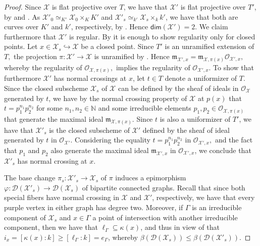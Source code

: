 \documentclass[a4paper,12pt,reqno]{amsart}
\newcommand\mc\mathcal
\theoremstyle{definition}
\numberwithin{equation}{thm}
\renewcommand{\leq}{\leqslant}
\renewcommand{\geq}{\geqslant}
\renewcommand{\dim}{\mathsf{dim}}
\begin{document}
\begin{proof} Since $\mathcal{X}$ is flat projective over $T$, we have that $\mathcal{X}'$ is  flat projective  over $T'$, by \cite[Corollary 3.3.32]{Liu} and \cite[Proposition 4.3.3, (e)]{Liu}. As $\mathcal{X}'_0\simeq_{K'}\mathcal{X}_{0}\times_{K}K'$ and $\mathcal{X}'_s \simeq_{k'} \mathcal{X}_s \times_k k'$, we have that both are curves over $K'$  and $k'$, respectively, by \cite[Proposition 3.2.7]{Liu}. Hence $\dim(\mathcal{X}')=2.$ We claim furthermore that $\mathcal{X}'$ is regular. By \cite[Corollary 4.2.17]{Liu} it is enough to show regularity only for closed points. Let $x\in\mathcal{X}_s \hookrightarrow \mc{X}$ be a closed point. Since $T'$ is an unramified extension of $T,$ the  projection $\pi:\mathcal{X}'\to\mathcal{X}$ is unramified by \cite[Proposition 4.3.22]{Liu}. Hence $\mathfrak{m}_{\mathcal{X}',x}=\mathfrak{m}_{\mathcal{X},\pi(x)}\mathcal{O}_{\mathcal{X}',x},$ whereby the regularity of $\mathcal{O}_{\mathcal{X},\pi(x)},$ implies the regularity of $\mathcal{O}_{\mathcal{X}',x}.$ 
To show that furthermore $\mc{X}'$ has normal crossings at $x$,  let $t\in T$ denote a uniformizer of $T$. Since the closed subscheme $\mathcal{X}_{s}$ of $\mc{X}$ can be defined by the sheaf of ideals in $\mathcal{O}_{\mc{X}}$ generated by $t$, we have by the normal crossing property of $\mc{X}$ at $p(x)$ that $t=p_{1}^{n_{1}}p_{2}^{n_{2}}$ for some $n_{1},n_{2}\in\mathbb{N}$ and some irreducible elements $p_{1},p_{2}\in\mathcal{O}_{\mathcal{X},\pi(x)}$ that generate the maximal ideal $\mathfrak{m}_{\mathcal{X},\pi(x)}.$ Since $t$ is also a uniformizer of $T'$, we have that $\mathcal{X}'_{s}$ is the closed subscheme of $\mathcal{X}'$ defined by the sheaf of ideal generated by $t$ in $\mathcal{O}_{\mathcal{X}'}.$ Considering the equality $t=p_{1}^{n_{1}}p_{2}^{n_{2}}$ in $\mathcal{O}_{\mathcal{X}',x},$ and the fact that $p_{1}$ and $p_{2}$ also generate the maximal ideal $\mathfrak{m}_{\mathcal{X}',x}$ in $\mathcal{O}_{\mathcal{X}',x}$,  we conclude that $\mathcal{X}'_{s}$ has normal crossing at $x.$ 

The base change $\pi_s: \mc{X}'_s \to \mc{X}_s$ of $\pi$ induces a epimorphism  $\varphi: \mc{D}(\mc{X}'_s) \to \mc{D}(\mc{X}_s)$ of bipartite connected graphs. Recall that since both special fibers have normal crossing in  $\mc{X}$ and $\mc{X}'$, respectively, we have that every purple vertex in either graph has degree two.
Moreover, if $\Gamma$ is an irreducible component of $\mc{X}_s$ and $x \in \Gamma$ a point of intersection with another irreducible component, then we have that $\ell_\Gamma \subseteq \kappa(x)$, and thus in view of  that $i_x=[\kappa(x): k] \geq [\ell_\Gamma :k]= e_\Gamma$, whereby  $\beta(\mc{D}(\mc{X}_s))\leq \beta(\mc{D}(\mc{X}'_s))$.
\end{proof}
\end{document}
